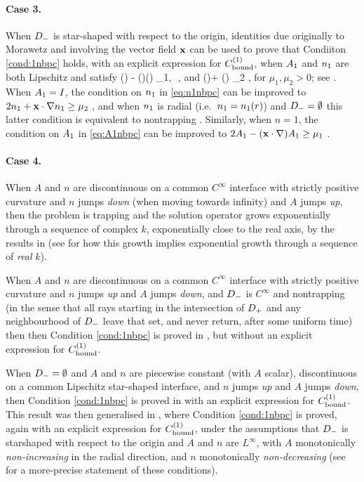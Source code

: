 \paragraph{Case 3.}
When $D_{-}$ is star-shaped with respect to the origin, identities due originally to Morawetz and involving the vector field $\mathbf{x}$ can be used to prove that Condiiton \ref{cond:1nbpc} holds, with an explicit expression for $C^{(1)}_{\rm bound}$, when $A_{1}$ and $n_{1}$ are both Lipschitz and satisfy
\beq\label{eq:A1nbpc}
\Ao(\bx) - (\bx\cdot\nabla)\Ao(\bx) \geq \mu_1,\,\, \bx\in \Dp,
\eeq
and 
\beq\label{eq:n1nbpc}
\no(\bx)+ \bx\cdot\nabla \no(\bx) \geq \mu_2 \quad{}\bx\in \Dp,
\eeq
for $\mu_1, \mu_2>0$;
see \cite[Theorem 2.5]{GrPeSp:19}. When $A_{1}= I$, the condition on $n_{1}$ in \eqref{eq:n1nbpc} can be improved to $2n_{1} + \mathbf{x} \cdot \nabla n_{1} \geq \mu_2$ \cite[Theorem 2.19(ii)]{GrPeSp:19}, and when $n_{1}$ is radial (i.e.~$n_{1}= n_{1}(r)$) and $D_{-}=\emptyset$ this latter condition is equivalent to nontrapping \cite[Theorem 7.7]{GrPeSp:19}.
Similarly, when $n= 1$, the condition on $A_{1}$ in \eqref{eq:A1nbpc} can be improved to $2A_{1} - (\mathbf{x}\cdot\nabla)A_{1} \geq \mu_1$
\cite[Theorem 2.19(i)]{GrPeSp:19}.

\paragraph{Case 4.}
When $A$ and $n$ are discontinuous on a common $C^\infty$ interface with strictly positive curvature and $n$ jumps \emph{down} (when moving towards infinity) and $A$ jumps \emph{up}, then the problem is trapping and the solution operator grows exponentially through a sequence of complex $k$, exponentially close to the real axis, by the results in \cite{PoVo:99a} (see \cite[\S6]{MoSp:19} for how this growth implies exponential growth through a sequence of \emph{real} $k$).

When $A$ and $n$ are discontinuous on a common $C^\infty$ interface with strictly positive curvature and $n$ jumps \emph{up} and $A$ jumps \emph{down}, and $D_{-}$ is 
$C^\infty$ and nontrapping (in the sense that all rays starting in the intersection of $D_{+}$ and any neighbourhood of $D_{-}$ leave that set, and never return, after some uniform time) then
then Condition \ref{cond:1nbpc} is proved in \cite{CaPoVo:99}, but without an explicit expression for $C^{(1)}_{\rm bound}$.

When $D_{-}=\emptyset$ and $A$ and $n$ are piecewise constant (with $A$ scalar), discontinuous on a common Lipschitz star-shaped interface, and $n$ jumps \emph{up} and $A$ jumps \emph{down}, then Condition \ref{cond:1nbpc} is proved in \cite{MoSp:19} with an explicit expression for $C^{(1)}_{\rm bound}$. 
This result was then generalised in \cite[Theorem 2.7]{GrPeSp:19}, where 
Condition \ref{cond:1nbpc} is proved, again with an explicit expression for $C^{(1)}_{\rm bound}$, under the assumptions that $D_{-}$ is starshaped with respect to the origin and $A$ and $n$ are $L^\infty$, with $A$ monotonically \emph{non-increasing} in the radial direction, and $n$ monotonically \emph{non-decreasing} (see \cite[Condition 2.6]{GrPeSp:19} for a more-precise statement of these conditions).


